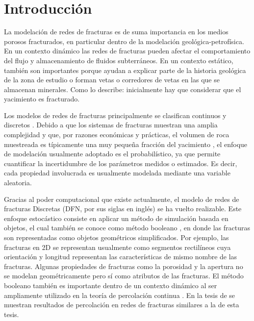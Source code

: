 \chapter{Introducci\'on}
\label{ch:intro}

La modelaci\'on de redes de fracturas es de suma importancia en los medios porosos fracturados, en particular dentro de la modelaci\'on geol\'ogica-petrof\'isica.
En un contexto din\'amico las redes de fracturas pueden afectar el comportamiento del flujo y almacenamiento de fluidos subterr\'aneos.
En un contexto est\'atico, tambi\'en son importantes porque ayudan a explicar parte de la historia geol\'ogica de la zona de estudio o forman vetas o corredores de vetas en las que se almacenan minerales.
Como \citet{nelson_geologic_2001} lo describe: inicialmente hay que considerar que el yacimiento es fracturado.

Los modelos de redes de fracturas principalmente se clasifican continuos y discretos \citep{Romano2016}.
Debido a que los sistemas de fracturas muestran una amplia complejidad \citep{adler_fractures_1999} y que, por razones econ\'omicas y pr\'acticas, el volumen de roca muestreada es t\'ipicamente una muy peque\~na fracci\'on del yacimiento \citep[p. 1]{chiles_geostatistics:_2012}, el enfoque de modelaci\'on usualmente adoptado es el probabil\'istico, ya que permite cuantificar la incertidumbre de los par\'ametros medidos o estimados.
Es decir, cada propiedad involucrada es usualmente modelada mediante una variable aleatoria.

Gracias al poder computacional que existe actualmente, el modelo de redes de fracturas Discretas (DFN, por sus siglas en ingl\'es) se ha vuelto realizable.
Este enfoque estoc\'astico consiste en aplicar un m\'etodo de simulaci\'on basada en objetos, el cual tambi\'en se conoce como m\'etodo booleano \citep{Stoyan1987,Cacas2001,chiles_geostatistics:_2012}, en donde las fracturas son representadas como objetos geom\'etricos simplificados.
Por ejemplo, las fracturas en 2D se representan usualmente como segmentos rectil\'ineos cuya orientaci\'on y longitud representan las caracter\'isticas de mismo nombre de las fracturas.
Algunas propiedades de fracturas como la porosidad y la apertura no se modelan geom\'etricamente pero s\'i como atributos de las fracturas.
El m\'etodo booleano tambi\'en es importante dentro de un contexto din\'amico al ser ampliamente utilizado en la teor\'ia de percolaci\'on continua \citep{meester_continuum_1996}. En la tesis de \citet{ayala-garcia_estimacion_2014} se muestran resultados de percolaci\'on en redes de fracturas similares a la de esta tesis.

